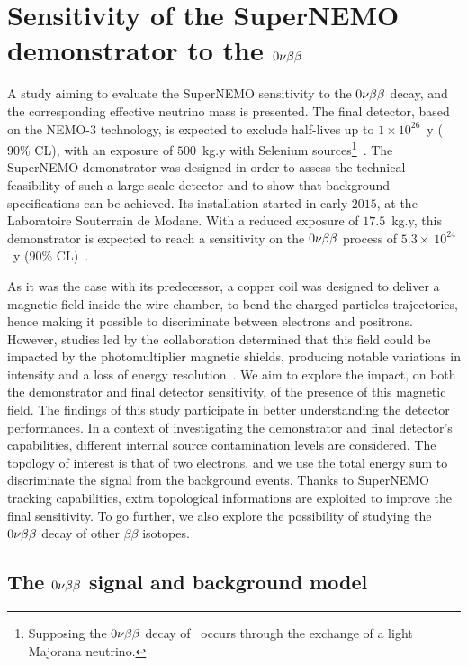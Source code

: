 \chapter{Sensitivity of the SuperNEMO demonstrator to the $0\nu\beta\beta$}
\label{ch:sensitivity}

A study aiming to evaluate the SuperNEMO sensitivity to the $0\nu\beta\beta$ decay, and the corresponding effective neutrino mass is presented.
The final detector, based on the NEMO-$3$ technology, is expected to exclude half-lives up to $1\times 10^{26}$~y ($90\%$ CL), with an exposure of $500$~kg.y with Selenium sources\footnote{Supposing the $0\nu\beta\beta$ decay of \Se\ occurs through the exchange of a light Majorana neutrino.}~\cite{art:SuperNEMO2010}.
The SuperNEMO demonstrator was designed in order to assess the technical feasibility of such a large-scale detector and to show that background specifications can be achieved.
Its installation started in early $2015$, at the Laboratoire Souterrain de Modane.
With a reduced exposure of $17.5$~kg.y, this demonstrator is expected to reach a sensitivity on the $0\nu\beta\beta$ process of $5.3\times~10^{24}$~y ($90\%$ CL)~\cite{CalvezThesis}.

As it was the case with its predecessor, a copper coil was designed to deliver a magnetic field inside the wire chamber, to bend the charged particles trajectories, hence making it possible to discriminate between electrons and positrons.
However, studies led by the collaboration determined that this field could be impacted by the photomultiplier magnetic shields, producing notable variations in intensity and a loss of energy resolution~\cite{CalvezThesis,internal:magnetic_field}.
We aim to explore the impact, on both the demonstrator and final detector sensitivity, of the presence of this magnetic field.
The findings of this study participate in better understanding the detector performances.
In a context of investigating the demonstrator and final detector's capabilities, different internal source contamination levels are considered.
The topology of interest is that of two electrons, and we use the total energy sum to discriminate the signal from the background events.
Thanks to SuperNEMO tracking capabilities, extra topological informations are exploited to improve the final sensitivity.
To go further, we also explore the possibility of studying the $0\nu\beta\beta$ decay of other $\beta\beta$ isotopes.

\section{The $0\nu\beta\beta$ signal and background model}
\label{sec:sensitivity_simus}

